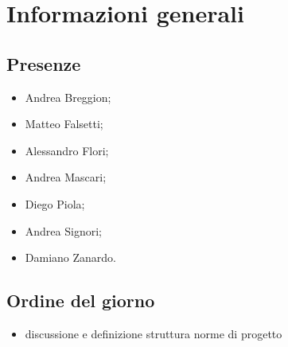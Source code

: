 \section{Informazioni generali}
    \def\modifiche { 
        {Data, 2020-12-09},
        {Ora inizio, 16:10},
        {Ora fine, 17:45},
        {Luogo, Discord},
    }
    

\subsection{Presenze}
\begin{itemize}
    \item Andrea Breggion;
    \item Matteo Falsetti;
    \item Alessandro Flori;
    \item Andrea Mascari;
    \item Diego Piola;
    \item Andrea Signori;
    \item Damiano Zanardo.
\end{itemize}
\subsection{Ordine del giorno}
\begin{itemize}
    \item discussione e definizione struttura norme di progetto
\end{itemize}
